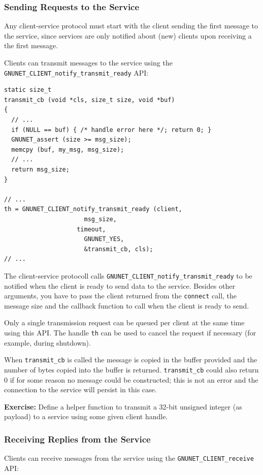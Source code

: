 \documentclass[10pt]{article}
\newcommand{\exercise}[1]{\noindent\begin{boxedminipage}{\textwidth}{\bf Exercise:} #1 \end{boxedminipage}}
\begin{document}
\subsubsection{Sending Requests to the Service}

Any client-service protocol must start with the client sending the
first message to the service, since services are only notified about
(new) clients upon receiving a the first message.

Clients can transmit messages to the service using the
{\tt GNUNET\_CLIENT\_notify\_transmit\_ready} API:
\lstset{language=c}
\begin{lstlisting}
static size_t
transmit_cb (void *cls, size_t size, void *buf)
{
  // ...
  if (NULL == buf) { /* handle error here */; return 0; }
  GNUNET_assert (size >= msg_size);
  memcpy (buf, my_msg, msg_size);
  // ...
  return msg_size;
}

// ...
th = GNUNET_CLIENT_notify_transmit_ready (client,
					  msg_size,
 				    timeout,
					  GNUNET_YES,
					  &transmit_cb, cls);
// ...
\end{lstlisting}

The client-service protocoll calls {\tt GNUNET\_CLIENT\_notify\_transmit\_ready}
to be notified when the client is ready to send data to the service.
Besides other arguments, you have to pass the client returned
from the {\tt connect} call, the message size and the callback function to
call when the client is ready to send.

Only a single transmission request can be queued per client at the
same time using this API.  The handle {\tt th} can be used to cancel
the request if necessary (for example, during shutdown).

When {\tt transmit\_cb} is called the message is copied in the buffer provided and
the number of bytes copied into the buffer is returned. {\tt transmit\_cb}
could also return 0 if for some reason no message
could be constructed; this is not an error and the connection to the
service will persist in this case.

\exercise{Define a helper function to transmit a 32-bit
unsigned integer (as payload) to a service using some given client
handle.}


\subsubsection{Receiving Replies from the Service}

Clients can receive messages from the service using the
{\tt GNUNET\_CLIENT\_receive} API:
\end{document}
